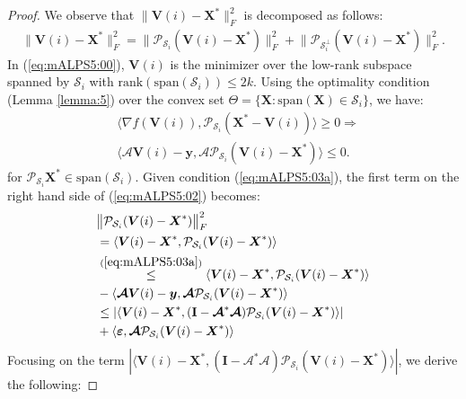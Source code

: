 \documentclass[twocolumn]{svjour3}
\newcommand{\vectornormbig}[1]{\big\|#1\big\|}
\newcommand{\obs}{\boldsymbol{y}}
\newcommand{\sensing}{\boldsymbol{\mathcal{A}}}
\newcommand{\signal}{\boldsymbol{X}}
\newcommand{\bestsignal}{\boldsymbol{X}^\ast}
\newcommand{\noise}{\boldsymbol{\varepsilon}}
\newcommand{\id}{\mathbf{I}}
\newcommand{\rank}{k}
\begin{document}
\begin{proof}
We observe that $ \vectornormbig{\boldsymbol{V}(i) - \bestsignal}_F^2 $ is decomposed as follows:
\begin{align}
\vectornormbig{\boldsymbol{V}(i) - \bestsignal}_F^2 = \vectornormbig{\mathcal{P}_{\mathcal{S}_i} (\boldsymbol{V}(i) - \bestsignal)}_F^2 + \vectornormbig{\mathcal{P}_{\mathcal{S}_i^{\bot}}(\boldsymbol{V}(i) - \bestsignal)}_F^2. \label{eq:mALPS5:02}
\end{align}
In (\ref{eq:mALPS5:00}), $ \boldsymbol{V}(i) $ is the minimizer over the low-rank subspace spanned by $ \mathcal{S}_i $ with $ \text{rank}(\text{span}(\mathcal{S}_i)) \leq 2\rank $. Using the optimality condition (Lemma \ref{lemma:5}) over the convex set $ \Theta = \lbrace \signal: \text{span}(\signal) \in \mathcal{S}_i \rbrace $, we have:
\begin{align}
&\langle \nabla f(\boldsymbol{V}(i)), \mathcal{P}_{\mathcal{S}_i}(\bestsignal - \boldsymbol{V}(i)) \rangle \geq 0 \Rightarrow \nonumber \\ &\langle \sensing \boldsymbol{V}(i) - \obs, \sensing \mathcal{P}_{\mathcal{S}_i}(\boldsymbol{V}(i) - \bestsignal) \rangle \leq 0. \label{eq:mALPS5:03a}
\end{align} for $ \mathcal{P}_{\mathcal{S}_i}\bestsignal \in \text{span}(\mathcal{S}_i) $.
Given condition (\ref{eq:mALPS5:03a}), the first term on the right hand side of (\ref{eq:mALPS5:02}) becomes: 
\begin{align}
&\vectornormbig{\mathcal{P}_{\mathcal{S}_i}(\boldsymbol{V}(i) - \bestsignal)}_F^2 \nonumber \\ &= \langle \boldsymbol{V}(i) - \bestsignal, \mathcal{P}_{\mathcal{S}_i}(\boldsymbol{V}(i) - \bestsignal) \rangle \nonumber \\ 
                            &\stackrel{(\ref{eq:mALPS5:03a})}{\leq} \langle \boldsymbol{V}(i) - \bestsignal, \mathcal{P}_{\mathcal{S}_i}(\boldsymbol{V}(i) - \bestsignal) \rangle \nonumber \\ &- \langle \sensing \boldsymbol{V}(i) - \obs, \sensing \mathcal{P}_{\mathcal{S}_i}(\boldsymbol{V}(i) - \bestsignal) \rangle \nonumber\\ 
                            &\leq | \langle \boldsymbol{V}(i) - \bestsignal, (\id - \sensing^\ast \sensing)\mathcal{P}_{\mathcal{S}_i}(\boldsymbol{V}(i) - \bestsignal) \rangle | \nonumber \\ &+ \langle \noise, \sensing \mathcal{P}_{\mathcal{S}_i}(\boldsymbol{V}(i) - \bestsignal) \rangle  \label{eq:mALPS5:08}
\end{align} Focusing on the term $ | \langle \boldsymbol{V}(i) - \bestsignal, (\id - \sensing^\ast \sensing)\mathcal{P}_{\mathcal{S}_i}(\boldsymbol{V}(i) - \bestsignal) \rangle | $, we derive the following:

\end{proof}
\end{document}
